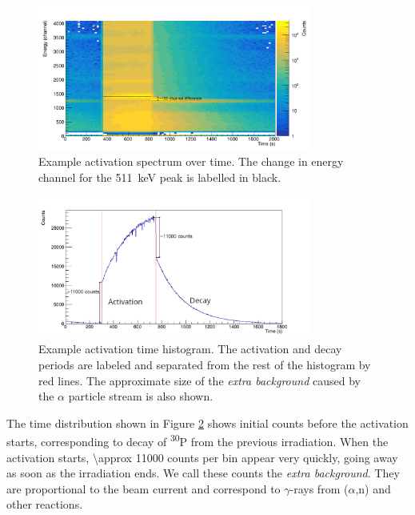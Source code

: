 \documentclass[a4paper,12pt]{report}
\newcommand{\an}{($\alpha$,n) }
\newcommand{\Piso}{\textsuperscript{30}P }
\begin{document}
\begin{figure}[H]
	\centering
	\includegraphics[width=0.80\textwidth]{example_activation_energytime.png}
	\caption{Example activation spectrum over time.	%
	The change in energy channel for the \qty{511}{\keV} peak is labelled in black.}
	\label{example_activation_energytime}
\end{figure}

\begin{figure}[H]
	\centering
	\includegraphics[width=0.80\textwidth]{example_activation_time_histogram.png}
	\caption{Example activation time histogram.
	The activation and decay periods are labeled and separated from the rest of the histogram by red lines.
	The approximate size of the \textit{extra background} caused by the $\alpha$ particle stream is also shown.}
	\label{example_activation_time_histogram}
\end{figure}

The time distribution shown in Figure \ref{example_activation_time_histogram} shows initial counts before the activation starts, corresponding to decay of \Piso from the previous irradiation.
When the activation starts, \num{\approx 11000} counts per bin appear very quickly, going away as soon as the irradiation ends.
We call these counts the \textit{extra background}.
They are proportional to the beam current and correspond to $\gamma$-rays from \an and other reactions.
\end{document}
